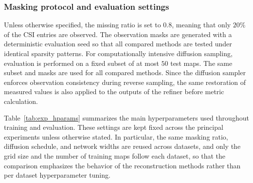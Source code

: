 \documentclass[lettersize,journal]{IEEEtran}
\begin{document}
\subsubsection{Masking protocol and evaluation settings}
Unless otherwise specified, the missing ratio is set to $0.8$, meaning that only $20\%$ of the CSI entries are observed. The observation masks are generated with a deterministic evaluation seed so that all compared methods are tested under identical sparsity patterns. For computationally intensive diffusion sampling, evaluation is performed on a fixed subset of at most $50$ test maps. The same subset and masks are used for all compared methods. Since the diffusion sampler enforces observation consistency during reverse sampling, the same restoration of measured values is also applied to the outputs of the refiner before metric calculation.

Table~\ref{tab:exp_hparams} summarizes the main hyperparameters used throughout training and evaluation. These settings are kept fixed across the principal experiments unless otherwise stated. In particular, the same masking ratio, diffusion schedule, and network widths are reused across datasets, and only the grid size and the number of training maps follow each dataset, so that the comparison emphasizes the behavior of the reconstruction methods rather than per dataset hyperparameter tuning.
\end{document}
